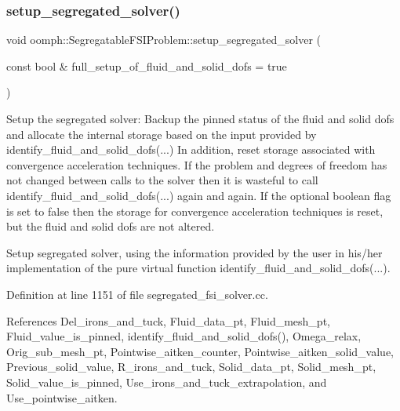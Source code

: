 \subsubsection{\texorpdfstring{setup\+\_\+segregated\+\_\+solver()}{setup\_segregated\_solver()}}
{\footnotesize\ttfamily void oomph\+::\+Segregatable\+F\+S\+I\+Problem\+::setup\+\_\+segregated\+\_\+solver (\begin{DoxyParamCaption}\item[{const bool \&}]{full\+\_\+setup\+\_\+of\+\_\+fluid\+\_\+and\+\_\+solid\+\_\+dofs = {\ttfamily true} }\end{DoxyParamCaption})}



Setup the segregated solver\+: Backup the pinned status of the fluid and solid dofs and allocate the internal storage based on the input provided by identify\+\_\+fluid\+\_\+and\+\_\+solid\+\_\+dofs(...) In addition, reset storage associated with convergence acceleration techniques. If the problem and degrees of freedom has not changed between calls to the solver then it is wasteful to call identify\+\_\+fluid\+\_\+and\+\_\+solid\+\_\+dofs(...) again and again. If the optional boolean flag is set to false then the storage for convergence acceleration techniques is reset, but the fluid and solid dofs are not altered. 

Setup segregated solver, using the information provided by the user in his/her implementation of the pure virtual function identify\+\_\+fluid\+\_\+and\+\_\+solid\+\_\+dofs(...). 

Definition at line 1151 of file segregated\+\_\+fsi\+\_\+solver.\+cc.



References Del\+\_\+irons\+\_\+and\+\_\+tuck, Fluid\+\_\+data\+\_\+pt, Fluid\+\_\+mesh\+\_\+pt, Fluid\+\_\+value\+\_\+is\+\_\+pinned, identify\+\_\+fluid\+\_\+and\+\_\+solid\+\_\+dofs(), Omega\+\_\+relax, Orig\+\_\+sub\+\_\+mesh\+\_\+pt, Pointwise\+\_\+aitken\+\_\+counter, Pointwise\+\_\+aitken\+\_\+solid\+\_\+value, Previous\+\_\+solid\+\_\+value, R\+\_\+irons\+\_\+and\+\_\+tuck, Solid\+\_\+data\+\_\+pt, Solid\+\_\+mesh\+\_\+pt, Solid\+\_\+value\+\_\+is\+\_\+pinned, Use\+\_\+irons\+\_\+and\+\_\+tuck\+\_\+extrapolation, and Use\+\_\+pointwise\+\_\+aitken.

\mbox{\label{classoomph_1_1SegregatableFSIProblem_a8f8145df86358916df505e2b513caf6a}} 
